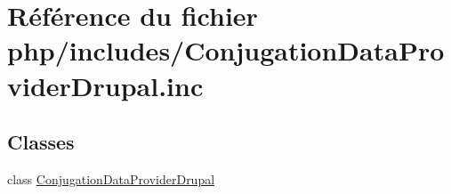 \hypertarget{_conjugation_data_provider_drupal_8inc}{}\section{Référence du fichier php/includes/\+Conjugation\+Data\+Provider\+Drupal.inc}
\label{_conjugation_data_provider_drupal_8inc}
\subsection*{Classes}
\begin{DoxyCompactItemize}
\item 
class \hyperlink{class_conjugation_data_provider_drupal}{Conjugation\+Data\+Provider\+Drupal}
\end{DoxyCompactItemize}
